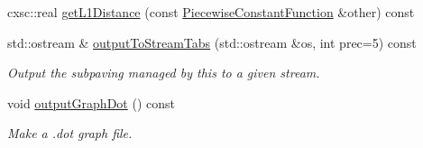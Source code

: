 \begin{DoxyCompactItemize}
cxsc\-::real \hyperlink{classsubpavings_1_1PiecewiseConstantFunction_ac1b7749f4bf0240e24517d87a832dbd7}{get\-L1\-Distance} (const \hyperlink{classsubpavings_1_1PiecewiseConstantFunction}{\-Piecewise\-Constant\-Function} \&other) const 
\item 
std\-::ostream \& \hyperlink{classsubpavings_1_1PiecewiseConstantFunction_a7253ce68ea35a9fb37fd8873ca0c23ef}{output\-To\-Stream\-Tabs} (std\-::ostream \&os, int prec=5) const 
\begin{DoxyCompactList}\small\item\em \-Output the subpaving managed by this to a given stream. \end{DoxyCompactList}\item 
void \hyperlink{classsubpavings_1_1PiecewiseConstantFunction_a779f82e68a07656a602089a25e994748}{output\-Graph\-Dot} () const 
\begin{DoxyCompactList}\small\item\em \-Make a .dot graph file. \end{DoxyCompactList}\end{DoxyCompactItemize}
